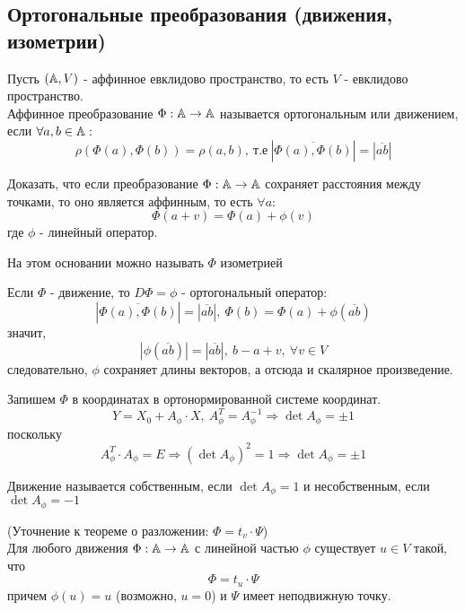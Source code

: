 \subsection{Ортогональные преобразования (движения, изометрии)}
\begin{definition}
    Пусть $(\mathbb{A},V)$ - аффинное евклидово пространство, то есть $V$ - евклидово пространство.\\
    Аффинное преобразование $\Phi: \mathbb{A}\to \mathbb{A}$ называется ортогональным или движением, если $\forall a,b\in \mathbb{A}:$
    \[\rho(\Phi(a),\Phi(b))=\rho(a,b),\ \text{т.е}\ |\overline{\Phi(a),\Phi(b)}|=|\overline{ab}|\]
\end{definition} 
\begin{exercise}
    Доказать, что если преобразование $\Phi: \mathbb{A}\to \mathbb{A}$ сохраняет расстояния между точками, то оно является аффинным, то есть $\forall a:$
    \[\Phi(a+v)=\Phi(a)+\phi(v)\]
    где $\phi$ - линейный оператор.
\end{exercise}
На этом основании можно называть $\Phi$ изометрией
\begin{remark}
    Если $\Phi$ - движение, то $D\Phi=\phi$ - ортогональный оператор:
    \[|\overline{\Phi(a),\Phi(b)}|=|\overline{ab}|,\ \Phi(b)=\Phi(a)+\phi(\overline{ab})\]
    значит,
    \[|\phi(\overline{ab})|=|\overline{ab}|,\ b-a+v,\ \forall v\in V\]
    следовательно, $\phi$ сохраняет длины векторов, а отсюда и скалярное произведение.
\end{remark}
Запишем $\Phi$ в координатах в ортонормированной системе координат.
\[Y=X_0+A_{\phi}\cdot X,\ A_{\phi}^T=A_{\phi}^{-1} \Longrightarrow \det{A_{\phi}}=\pm 1\]
поскольку
\[A_{\phi}^T\cdot A_{\phi}=E \Longrightarrow (\det{A_{\phi}})^2=1 \Longrightarrow \det{A_{\phi}}=\pm 1\]
\begin{definition}
    Движение называется собственным, если $\det{A_{\phi}}=1$ и несобственным, если $\det{A_{\phi}}=-1$
\end{definition} 
\begin{remark}
    (Уточнение к теореме о разложении: $\Phi=t_v\cdot\Psi$)\\
    Для любого движения $\Phi:\mathbb{A}\to \mathbb{A}$ с линейной частью $\phi$ существует $u\in V$ такой, что
    \[\Phi=t_u\cdot \Psi\]
    причем $\phi(u)=u$ (возможно, $u = 0$) и $\Psi$ имеет неподвижную точку.
\end{remark}
